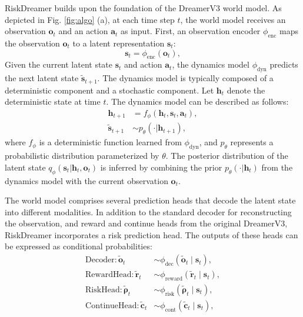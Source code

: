 RiskDreamer builds upon the foundation of the DreamerV3 world model. As depicted in Fig. \ref{fig:algo} (a), at each time step $t$, the world model receives an observation $\mathbf{o}_t$ and an action $\mathbf{a}_t$ as input. First, an observation encoder $\phi_{\text{enc}}$ maps the observation $\mathbf{o}_t$ to a latent representation $\mathbf{s}_t$:
\begin{equation}
\mathbf{s}_t = \phi_{\text{enc}}(\mathbf{o}_t),
\end{equation}
Given the current latent state $\mathbf{s}_t$ and action $\mathbf{a}_t$, the dynamics model $\phi_{\text{dyn}}$ predicts the next latent state $\widetilde{\mathbf{s}}_{t+1}$. The dynamics model is typically composed of a deterministic component and a stochastic component. Let $\boldsymbol{h}_t$ denote the deterministic state at time $t$. The dynamics model can be described as follows:
\begin{equation}
    \begin{split}
    \boldsymbol{h}_{t+1} &= f_{\phi}(\boldsymbol{h}_t, \mathbf{s}_t, \mathbf{a}_t), \\
    \widetilde{\mathbf{s}}_{t+1} &\sim p_{\theta}(\cdot | \boldsymbol{h}_{t+1}),
    \end{split}
\end{equation}
where $f_{\phi}$ is a deterministic function learned from $\phi_{\text{dyn}}$, and $p_{\theta}$ represents a probabilistic distribution parameterized by $\theta$. The posterior distribution of the latent state $q_{\phi}(\mathbf{s}_t | \boldsymbol{h}_t, \mathbf{o}_t)$ is inferred by combining the prior $p_{\theta}(\cdot | \boldsymbol{h}_{t})$ from the dynamics model with the current observation $\mathbf{o}_{t}$.

The world model comprises several prediction heads that decode the latent state into different modalities. In addition to the standard decoder for reconstructing the observation, and reward and continue heads from the original DreamerV3, RiskDreamer incorporates a risk prediction head. The outputs of these heads can be expressed as conditional probabilities:
\begin{equation}
    \begin{split}
    \text{Decoder}: \widetilde{\mathbf{o}}_t &\sim {\phi_{\text{dec}}}(\widetilde{\mathbf{o}}_t \mid \mathbf{s}_t), \\
    \text{RewardHead}: \widetilde{\mathbf{r}}_t &\sim {\phi_{\text{reward}}}(\widetilde{\mathbf{r}}_t \mid \mathbf{s}_t), \\
    \text{RiskHead}: \widetilde{\mathbf{\rho}}_t &\sim {\phi_{\text{risk}}}(\widetilde{\mathbf{\rho}}_t \mid \mathbf{s}_t), \\
    \text{ContinueHead}: \widetilde{\mathbf{c}}_t &\sim {\phi_{\text{cont}}}(\widetilde{\mathbf{c}}_t \mid \mathbf{s}_t),
    \end{split}
\end{equation}

